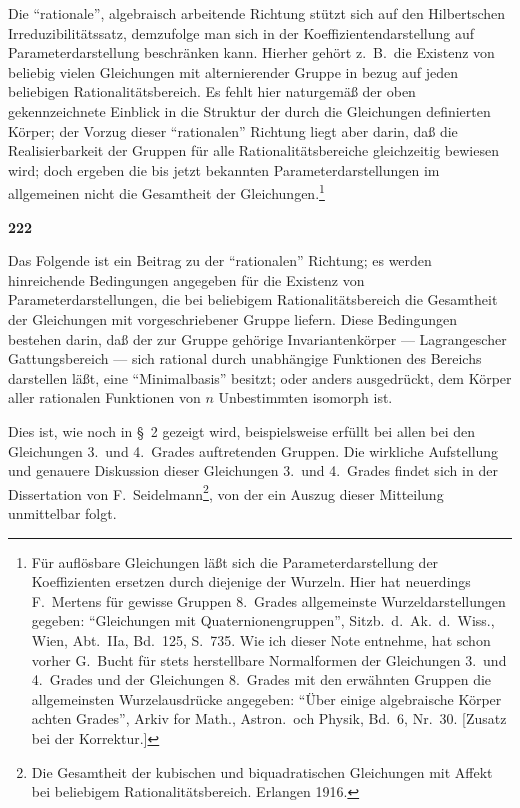 \documentclass[12pt,a4paper]{article}
\begin{document}
Die ``rationale'', algebraisch arbeitende Richtung st\"utzt sich auf den Hilbertschen Irreduzibilit\"atssatz, demzufolge man sich in der Koeffizientendarstellung auf Parameterdarstellung beschr\"anken kann. Hierher geh\"ort z.\ B.\ die Existenz von beliebig vielen Gleichungen mit alternierender Gruppe in bezug auf jeden beliebigen Rationalit\"atsbereich. Es fehlt hier naturgem\"a\ss{} der oben gekennzeichnete Einblick in die Struktur der durch die Gleichungen definierten K\"orper; der Vorzug dieser ``rationalen'' Richtung liegt aber darin, da\ss{} die Realisierbarkeit der Gruppen f\"ur alle Rationalit\"atsbereiche gleichzeitig bewiesen wird; doch ergeben die bis jetzt bekannten Parameterdarstellungen im allgemeinen nicht die Gesamtheit der Gleichungen.\footnote{F\"ur aufl\"osbare Gleichungen l\"a\ss t sich die Parameterdarstellung der Koeffizienten ersetzen durch diejenige der Wurzeln. Hier hat neuerdings F.\ Mertens f\"ur gewisse Gruppen 8.\ Grades allgemeinste Wurzeldarstellungen gegeben: ``Gleichungen mit Quaternionengruppen'', Sitzb.\ d.\ Ak.\ d.\ Wiss., Wien, Abt.\ IIa, Bd.\ 125, S.\ 735. Wie ich dieser Note entnehme, hat schon vorher G.\ Bucht f\"ur stets herstellbare Normalformen der Gleichungen 3.\ und 4.\ Grades und der Gleichungen 8.\ Grades mit den erw\"ahnten Gruppen die allgemeinsten Wurzelausdr\"ucke angegeben: ``\"Uber einige algebraische K\"orper achten Grades'', Arkiv for Math., Astron.\ och Physik, Bd.\ 6, Nr.\ 30. [Zusatz bei der Korrektur.]}

\newpage
\begin{center}
\textbf{222}
\end{center}

Das Folgende ist ein Beitrag zu der ``rationalen'' Richtung; es werden hinreichende Bedingungen angegeben f\"ur die Existenz von Parameterdarstellungen, die bei beliebigem Rationalit\"atsbereich die Gesamtheit der Gleichungen mit vorgeschriebener Gruppe liefern. Diese Bedingungen bestehen darin, da\ss{} der zur Gruppe geh\"orige Invariantenk\"orper --- Lagrangescher Gattungsbereich --- sich rational durch unabh\"angige Funktionen des Bereichs darstellen l\"a\ss t, eine ``Minimalbasis'' besitzt; oder anders ausgedr\"uckt, dem K\"orper aller rationalen Funktionen von $n$ Unbestimmten isomorph ist.

Dies ist, wie noch in \S\ 2 gezeigt wird, beispielsweise erf\"ullt bei allen bei den Gleichungen 3.\ und 4.\ Grades auftretenden Gruppen. Die wirkliche Aufstellung und genauere Diskussion dieser Gleichungen 3.\ und 4.\ Grades findet sich in der Dissertation von F.\ Seidelmann\footnote{Die Gesamtheit der kubischen und biquadratischen Gleichungen mit Affekt bei beliebigem Rationalit\"atsbereich. Erlangen 1916.}, von der ein Auszug dieser Mitteilung unmittelbar folgt.
\end{document}

